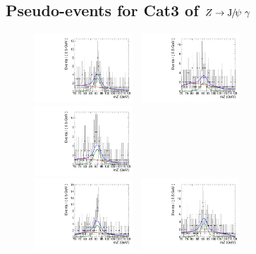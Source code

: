 \subsection{Pseudo-events for Cat3 of $Z\to {\mathrm{J}\hspace{-.08em}/\hspace{-.14em}\psi}\ \gamma$}
\begin{figure}[!ht]
  \centering
  \includegraphics[width=0.33\textwidth]{Fig/BiasStudy/Toys/ZJpsiG_Cat3/TruePdf2_FitPdf2_mu200_sbfit_1231_cat3}~
  \includegraphics[width=0.33\textwidth]{Fig/BiasStudy/Toys/ZJpsiG_Cat3/TruePdf2_FitPdf2_mu200_sbfit_1235_cat3}~
  \includegraphics[width=0.33\textwidth]{Fig/BiasStudy/Toys/ZJpsiG_Cat3/TruePdf2_FitPdf2_mu200_sbfit_12349_cat3}\\
  \includegraphics[width=0.33\textwidth]{Fig/BiasStudy/Toys/ZJpsiG_Cat3/TruePdf2_FitPdf2_mu200_sbfit_12336_cat3}~
  \includegraphics[width=0.33\textwidth]{Fig/BiasStudy/Toys/ZJpsiG_Cat3/TruePdf2_FitPdf2_mu200_sbfit_12324_cat3}~

\end{figure}
